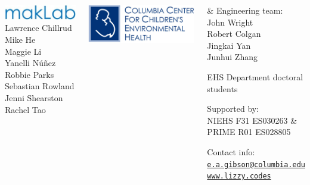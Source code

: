 \documentclass{beamer}
\begin{document}
{\begin{columns}

\begin{flushright}
\includegraphics[scale=0.35]{figures/makLab_logo.jpg} \\ 
\vspace{2mm}
\small Lawrence Chillrud \\
Mike He \\
Maggie Li \\
Yanelli N\'{u}\~{n}ez \\
Robbie Parks \\
Sebastian Rowland \\
Jenni Shearston \\
Rachel Tao \\
\end{flushright}

\begin{center}
\includegraphics[scale=0.25]{figures/ccceh_logo.jpg}
\end{center}


\begin{flushright}
\small{\& Engineering team: \\
            John Wright \\
            Robert Colgan \\
            Jingkai Yan \\
            Junhui Zhang}

\vspace{5mm}

EHS Department doctoral students

\vspace{5mm}

{\tiny\color{hgray}Supported by: \\
NIEHS F31 ES030263 \& \\
PRIME R01 ES028805 \\
}

\vspace{5mm}

\tiny Contact info: \\
\vspace{0.5ex}
\hspace{-2ex}
\href{mailto:e.a.gibson@columbia.edu}{\faEnvelopeO \hspace{0.25ex} \tt e.a.gibson@columbia.edu} \\
\href{http://www.lizzy.codes}{\faGlobe \hspace{0.5ex} \tt www.lizzy.codes}
\end{flushright}

\end{columns}
}
\end{document}
